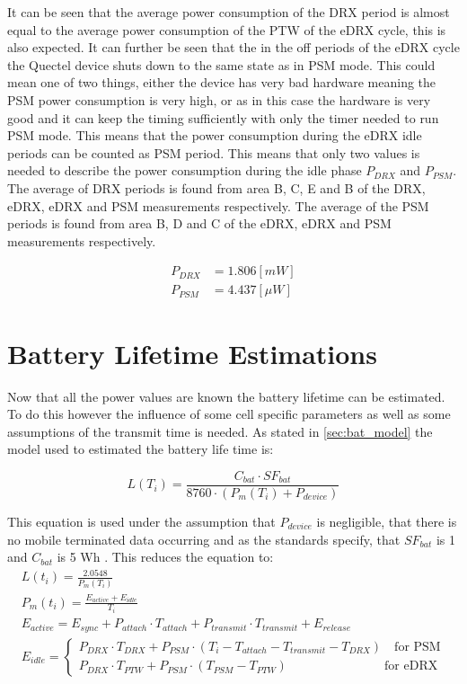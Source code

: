 It can be seen that the average power consumption of the DRX period is almost equal to the average power consumption of the PTW of the eDRX cycle, this is also expected. It can further be seen that the in the off periods of the eDRX cycle the Quectel device shuts down to the same state as in PSM mode. This could  mean one of two things, either the device has very bad hardware meaning the PSM power consumption is very high, or as in this case the hardware is very good and it can keep the timing sufficiently with only the timer needed to run PSM mode. This means that the power consumption during the eDRX idle periods can be counted as PSM period. This means that only two values is needed to describe the power consumption during the idle phase $P_{DRX}$ and $P_{PSM}$. The average of DRX periods is found from area B, C, E and B of the DRX, eDRX, eDRX and PSM measurements respectively. The average of the PSM periods is found from area B, D and C of the eDRX, eDRX and PSM measurements respectively.

\begin{align}
P_{DRX} &= 1.806 [mW] \\
P_{PSM} &= 4.437 [\mu W]
\end{align}


\section{Battery Lifetime Estimations}

Now that all the power values are known the battery lifetime can be estimated. To do this however the influence of some cell specific parameters as well as some assumptions of the transmit time is needed. As stated in \autoref{sec:bat_model} the model used to estimated the battery life time is:

\begin{equation}
L(T_i) = \frac{C_{bat}\cdot SF_{bat}}{8760\cdot (P_m(T_i) + P_{device})}
\end{equation}


This equation is used under the assumption that $P_{device}$ is negligible, that there is no mobile terminated data occurring and as the standards specify, that $SF_{bat}$ is 1 and $C_{bat}$ is 5 Wh \citep[sec. 5.4]{safty_factor_standard}. This reduces the equation to:
\begin{equation}\label{eq:bat_est}
\begin{gathered}
	L(t_i) = \frac{2.0548}{P_m(T_i)} \\
	P_m(t_i) = \frac{E_{active} + E_{idle}}{T_i} \\
	E_{active} = E_{sync} + P_{attach}\cdot T_{attach} + P_{transmit}\cdot T_{transmit} + E_{release} \\
	E_{idle} = \begin{cases} P_{DRX}\cdot T_{DRX} + P_{PSM}\cdot (T_i - T_{attach} - T_{transmit} - T_{DRX}) \quad \text{for PSM}\\
							P_{DRX}\cdot T_{PTW} + P_{PSM} \cdot (T_{PSM} - T_{PTW}) \qquad\qquad\qquad\quad\;\;\, \text{for eDRX}
				\end{cases}
\end{gathered}
\end{equation}

